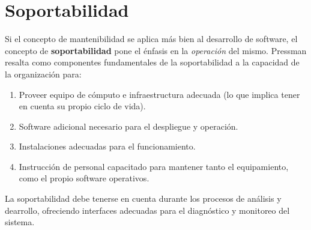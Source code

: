 \section{Soportabilidad}

Si el concepto de mantenibilidad se aplica más bien al desarrollo de software,
el concepto de \textbf{soportabilidad} pone el énfasis en la \textit{operación}
del mismo.
Pressman resalta como componentes fundamentales de la soportabilidad a la 
capacidad de la organización para:
\begin{enumerate}
    \item Proveer equipo de cómputo e infraestructura adecuada
    (lo que implica tener en cuenta su propio ciclo de vida).
    \item Software adicional necesario para el despliegue y operación.
    \item Instalaciones adecuadas para el funcionamiento.
    \item Instrucción de personal capacitado para mantener tanto el equipamiento,
    como el propio software operativos.
\end{enumerate}

La soportabilidad debe tenerse en cuenta durante los procesos de análisis y 
dearrollo, ofreciendo interfaces adecuadas para el diagnóstico y monitoreo del 
sistema.